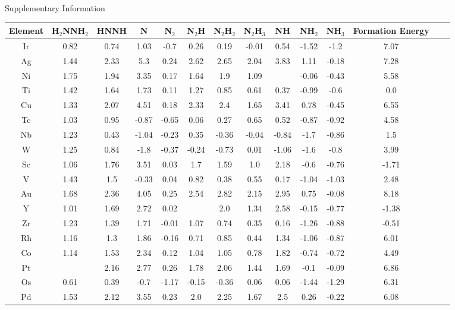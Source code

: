 Supplementary Information
\onecolumn
\begin{table}
\begin{center}
\begin{tabular}{| c | c | c | c | c | c | c | c | c | c | c | c | c | c |}
\hline
Element & H$_2$NNH$_2$ & HNNH & N & N$_2$ & N$_2$H & N$_2$H$_2$ & N$_2$H$_3$ & NH & NH$_2$ & NH$_3$ & Formation Energy\\
\hline

Ir & 0.82 & 0.74 & 1.03 & -0.7 & 0.26 & 0.19 & -0.01 & 0.54 & -1.52 & -1.2 & 7.07 \\
Ag & 1.44 & 2.33 & 5.3 & 0.24 & 2.62 & 2.65 & 2.04 & 3.83 & 1.11 & -0.18 & 7.28 \\
Ni & 1.75 & 1.94 & 3.35 & 0.17 & 1.64 & 1.9 & 1.09 &  & -0.06 & -0.43 & 5.58 \\
Ti & 1.42 & 1.64 & 1.73 & 0.11 & 1.27 & 0.85 & 0.61 & 0.37 & -0.99 & -0.6 & 0.0 \\
Cu & 1.33 & 2.07 & 4.51 & 0.18 & 2.33 & 2.4 & 1.65 & 3.41 & 0.78 & -0.45 & 6.55 \\
Tc & 1.03 & 0.95 & -0.87 & -0.65 & 0.06 & 0.27 & 0.65 & 0.52 & -0.87 & -0.92 & 4.58 \\
Nb & 1.23 & 0.43 & -1.04 & -0.23 & 0.35 & -0.36 & -0.04 & -0.84 & -1.7 & -0.86 & 1.5 \\
W & 1.25 & 0.84 & -1.8 & -0.37 & -0.24 & -0.73 & 0.01 & -1.06 & -1.6 & -0.8 & 3.99 \\
Sc & 1.06 & 1.76 & 3.51 & 0.03 & 1.7 & 1.59 & 1.0 & 2.18 & -0.6 & -0.76 & -1.71 \\
V & 1.43 & 1.5 & -0.33 & 0.04 & 0.82 & 0.38 & 0.55 & 0.17 & -1.04 & -1.03 & 2.48 \\
Au & 1.68 & 2.36 & 4.05 & 0.25 & 2.54 & 2.82 & 2.15 & 2.95 & 0.75 & -0.08 & 8.18 \\
Y & 1.01 & 1.69 & 2.72 & 0.02 &  & 2.0 & 1.34 & 2.58 & -0.15 & -0.77 & -1.38 \\
Zr & 1.23 & 1.39 & 1.71 & -0.01 & 1.07 & 0.74 & 0.35 & 0.16 & -1.26 & -0.88 & -0.51 \\
Rh & 1.16 & 1.3 & 1.86 & -0.16 & 0.71 & 0.85 & 0.44 & 1.34 & -1.06 & -0.87 & 6.01 \\
Co & 1.14 & 1.53 & 2.34 & 0.12 & 1.04 & 1.05 & 0.78 & 1.82 & -0.74 & -0.72 & 4.49 \\
Pt &  & 2.16 & 2.77 & 0.26 & 1.78 & 2.06 & 1.44 & 1.69 & -0.1 & -0.09 & 6.86 \\
Os & 0.61 & 0.39 & -0.7 & -1.17 & -0.15 & -0.36 & 0.06 & 0.06 & -1.44 & -1.29 & 6.31 \\
Pd & 1.53 & 2.12 & 3.55 & 0.23 & 2.0 & 2.25 & 1.67 & 2.5 & 0.26 & -0.22 & 6.08 \\

\end{tabular}
\end{center}
\end{table}
